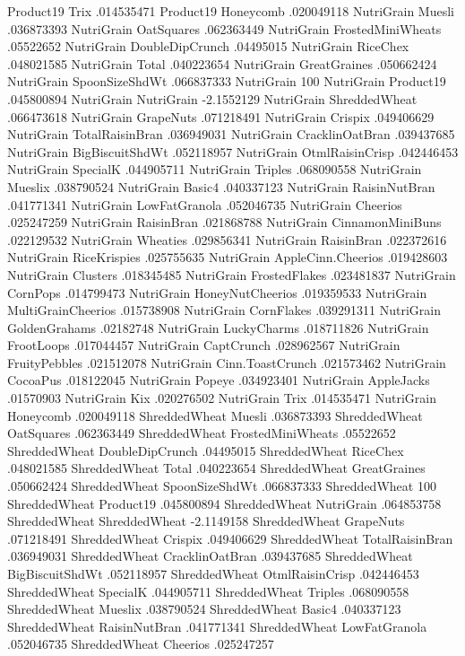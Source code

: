 Product19	Trix	.014535471
Product19	Honeycomb	.020049118
NutriGrain	Muesli	.036873393
NutriGrain	OatSquares	.062363449
NutriGrain	FrostedMiniWheats	.05522652
NutriGrain	DoubleDipCrunch	.04495015
NutriGrain	RiceChex	.048021585
NutriGrain	Total	.040223654
NutriGrain	GreatGraines	.050662424
NutriGrain	SpoonSizeShdWt	.066837333
NutriGrain	100%
NutriGrain	Product19	.045800894
NutriGrain	NutriGrain	-2.1552129
NutriGrain	ShreddedWheat	.066473618
NutriGrain	GrapeNuts	.071218491
NutriGrain	Crispix	.049406629
NutriGrain	TotalRaisinBran	.036949031
NutriGrain	CracklinOatBran	.039437685
NutriGrain	BigBiscuitShdWt	.052118957
NutriGrain	OtmlRaisinCrisp	.042446453
NutriGrain	SpecialK	.044905711
NutriGrain	Triples	.068090558
NutriGrain	Mueslix	.038790524
NutriGrain	Basic4	.040337123
NutriGrain	RaisinNutBran	.041771341
NutriGrain	LowFatGranola	.052046735
NutriGrain	Cheerios	.025247259
NutriGrain	RaisinBran	.021868788
NutriGrain	CinnamonMiniBuns	.022129532
NutriGrain	Wheaties	.029856341
NutriGrain	RaisinBran	.022372616
NutriGrain	RiceKrispies	.025755635
NutriGrain	AppleCinn.Cheerios	.019428603
NutriGrain	Clusters	.018345485
NutriGrain	FrostedFlakes	.023481837
NutriGrain	CornPops	.014799473
NutriGrain	HoneyNutCheerios	.019359533
NutriGrain	MultiGrainCheerios	.015738908
NutriGrain	CornFlakes	.039291311
NutriGrain	GoldenGrahams	.02182748
NutriGrain	LuckyCharms	.018711826
NutriGrain	FrootLoops	.017044457
NutriGrain	CaptCrunch	.028962567
NutriGrain	FruityPebbles	.021512078
NutriGrain	Cinn.ToastCrunch	.021573462
NutriGrain	CocoaPus	.018122045
NutriGrain	Popeye	.034923401
NutriGrain	AppleJacks	.01570903
NutriGrain	Kix	.020276502
NutriGrain	Trix	.014535471
NutriGrain	Honeycomb	.020049118
ShreddedWheat	Muesli	.036873393
ShreddedWheat	OatSquares	.062363449
ShreddedWheat	FrostedMiniWheats	.05522652
ShreddedWheat	DoubleDipCrunch	.04495015
ShreddedWheat	RiceChex	.048021585
ShreddedWheat	Total	.040223654
ShreddedWheat	GreatGraines	.050662424
ShreddedWheat	SpoonSizeShdWt	.066837333
ShreddedWheat	100%
ShreddedWheat	Product19	.045800894
ShreddedWheat	NutriGrain	.064853758
ShreddedWheat	ShreddedWheat	-2.1149158
ShreddedWheat	GrapeNuts	.071218491
ShreddedWheat	Crispix	.049406629
ShreddedWheat	TotalRaisinBran	.036949031
ShreddedWheat	CracklinOatBran	.039437685
ShreddedWheat	BigBiscuitShdWt	.052118957
ShreddedWheat	OtmlRaisinCrisp	.042446453
ShreddedWheat	SpecialK	.044905711
ShreddedWheat	Triples	.068090558
ShreddedWheat	Mueslix	.038790524
ShreddedWheat	Basic4	.040337123
ShreddedWheat	RaisinNutBran	.041771341
ShreddedWheat	LowFatGranola	.052046735
ShreddedWheat	Cheerios	.025247257
